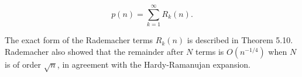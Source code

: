 $$p(n) = \sum_{k=1}^{\infty} R_k(n).$$

The exact form of the Rademacher terms $R_k(n)$ is described in Theorem 5.10. Rademacher also showed that the remainder after $N$ terms is $O(n^{-1/4})$ when $N$ is of order $\sqrt{n}$, in agreement with the Hardy-Ramanujan expansion.
